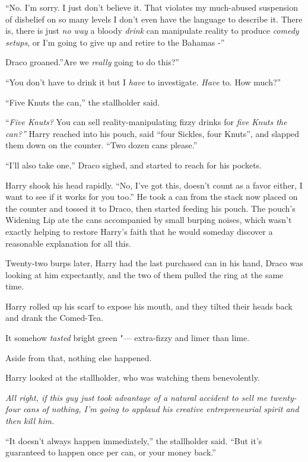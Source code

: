 ``No. I'm sorry. I just don't believe it. That violates my much-abused
suspension of disbelief on so many levels I don't even have the language
to describe it. There is, there is just \emph{no way} a bloody
\emph{drink} can manipulate reality to produce \emph{comedy setups}, or
I'm going to give up and retire to the Bahamas -''

Draco groaned.''Are we \emph{really} going to do this?''

``You don't have to drink it but I \emph{have} to investigate.
\emph{Have} to. How much?''

``Five Knuts the can,'' the stallholder said.

``\emph{Five Knuts?} You can sell reality-manipulating fizzy drinks for
\emph{five Knuts the can?''} Harry reached into his pouch, said ``four
Sickles, four Knuts'', and slapped them down on the counter. ``Two dozen
cans please.''

``I'll also take one,'' Draco sighed, and started to reach for his
pockets.

Harry shook his head rapidly. ``No, I've got this, doesn't count as a
favor either, I want to see if it works for you too.'' He took a can
from the stack now placed on the counter and tossed it to Draco, then
started feeding his pouch. The pouch's Widening Lip ate the cans
accompanied by small burping noises, which wasn't exactly helping to
restore Harry's faith that he would someday discover a reasonable
explanation for all this.

Twenty-two burps later, Harry had the last purchased can in his hand,
Draco was looking at him expectantly, and the two of them pulled the
ring at the same time.

Harry rolled up his scarf to expose his mouth, and they tilted their
heads back and drank the Comed-Tea.

It somehow \emph{tasted} bright green "--- extra-fizzy and limer than lime.

Aside from that, nothing else happened.

Harry looked at the stallholder, who was watching them benevolently.

\emph{All right, if this guy just took advantage of a natural accident
to sell me twenty-four cans of nothing}\emph{, I'm going to applaud his
creative entrepreneurial spirit and then kill him.}

``It doesn't always happen immediately,'' the stallholder said. ``But
it's guaranteed to happen once per can, or your money back.''

